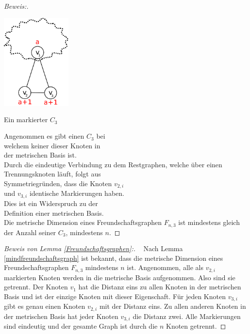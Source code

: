 \begin{proof}[Beweis:]~
\par
\begin{floatingfigure}[l]{200pt}
{\flushleft
\hspace*{1.7cm}
\includegraphics[width=100pt]{bilder/freundschaftsgraphbew.pdf}}
\caption{Ein markierter $C_{3}$}
\label{CA9}
\end{floatingfigure}

Angenommen es gibt einen $C_3$ bei\\welchem keiner dieser Knoten in\\der metrischen Basis ist.\\Durch die eindeutige Verbindung zu dem Restgraphen, welche über einen\\Trennungsknoten läuft, folgt aus\\Symmetriegründen, dass die Knoten $v_{2,i}$\\und $v_{3,i}$ identische Markierungen haben.\\Dies ist ein Widerspruch zu der\\Definition einer metrischen Basis.\\
Die metrische Dimension eines Freundschaftsgraphen $F_{n,3}$ ist mindestens gleich der Anzahl seiner $C_{3}$, mindestens $n$.
\end{proof}
\par
\vspace{-6mm}
\begin{proof}[Beweis von Lemma \ref{Freundschaftsgraphen}:] \vspace{+1mm} ~ \linebreak
Nach Lemma \ref{mindfreundschaftsgraph} ist bekannt, dass die metrische Dimension eines Freundschaftsgraphen $F_{n,3}$ mindestens $n$ ist. Angenommen, alle als $v_{2,i}$ markierten Knoten werden in die metrische Basis aufgenommen. Also sind sie getrennt. Der Knoten $v_1$ hat die Distanz eins zu allen Knoten in der metrischen Basis und ist der einzige Knoten mit dieser Eigenschaft. Für jeden Knoten $v_{3,i}$ gibt es genau einen Knoten $v_{2,i}$ mit der Distanz eins. Zu allen anderen Knoten in der metrischen Basis hat jeder Knoten $v_{3,i}$ die Distanz zwei. Alle Markierungen sind eindeutig und der gesamte Graph ist durch die $n$ Knoten getrennt.
\end{proof}
\vspace{-12mm}
~ \linebreak

